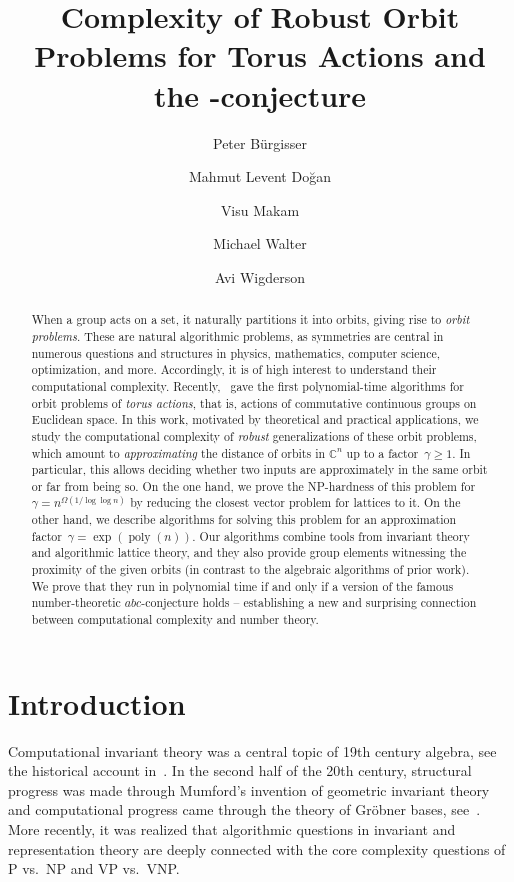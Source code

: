 \documentclass[a4paper,USenglish,cleveref,numberwithinsect]{lipics-v2021}
\title{Complexity of Robust Orbit Problems for Torus Actions and the \abc-conjecture}
\author{Peter B\"{u}rgisser}{Institute of Mathematics, Technische Universit\"{a}t Berlin, Germany.}{pbuerg@math.tu-berlin.de}{}{Supported by the ERC under the European Union's Horizon 2020 research and innovation programme (grant agreement no.~787840).}
\author{Mahmut Levent Do\u{g}an}{Institute of Mathematics, Technische Universit\"{a}t Berlin, Germany.}{dogan@math.tu-berlin.de}{}{Supported by the ERC under the European Union's Horizon 2020 research and innovation programme (grant agreement no.~787840).}
\author{Visu Makam}{Radix Trading, Amsterdam.}{visu@umich.edu}{}{Partially supported by NSF Grant CCF-1900460 and the University of Melbourne.}
\author{Michael Walter}{Faculty of Computer Science, Ruhr-Universit\"at Bochum, Germany.}{michael.walter@rub.de}{}{Supported by the European Union (ERC, SYMOPTIC, 101040907), by the Deutsche Forschungsgemeinschaft (DFG, German Research Foundation) under Germany's Excellence Strategy - EXC\ 2092\ CASA - 390781972, by the BMBF (QuBRA, 13N16135), and by the Dutch Research Council (NWO grant OCENW.KLEIN.267).}
\author{Avi Wigderson}{School of Mathematics, Institute for Advanced Study, Princeton.}{avi@ias.edu}{}{Supported by the NSF Grant CCF-1900460.}
\DeclareMathOperator{\poly}{poly}
\newcommand{\CC}{\mathbb{C}}
\numberwithin{equation}{section}
\begin{document}
\maketitle

\begin{abstract}
When a group acts on a set, it naturally partitions it into orbits, giving rise to \emph{orbit problems}.
These are natural algorithmic problems, as symmetries are central in numerous questions and structures in physics, mathematics, computer science, optimization, and more.
Accordingly, it is of high interest to understand their computational complexity.
Recently,~\cite{torus} gave the first polynomial-time algorithms for orbit problems of \emph{torus actions}, that is, actions of commutative continuous groups on Euclidean space.
In this work, motivated by theoretical and practical applications, we study the computational complexity of \textit{robust} generalizations of these orbit problems, which amount to \emph{approximating} the distance of orbits in $\CC^n$ up to a factor~$\gamma \ge 1$.
In particular, this allows deciding whether two inputs are approximately in the same orbit or far from being so.
On the one hand, we prove the NP-hardness of this problem for~$\gamma = n^{\Omega(1/\log\log n)}$ by reducing the closest vector problem for lattices to it.
On the other hand, we describe algorithms for solving this problem for an approximation factor~$\gamma = \exp(\poly(n))$.
Our algorithms combine tools from invariant theory and algorithmic lattice theory, and they also provide group elements witnessing the proximity of the given orbits (in contrast to the algebraic algorithms of prior work).
We prove that they run in polynomial time if and only if a version of the famous number-theoretic $abc$-conjecture holds -- establishing
a new and surprising connection between computational complexity and number theory.
\end{abstract}

\section{Introduction}
\label{sec:intro}

Computational invariant theory was a central topic of 19th century algebra,
see the historical account in~\cite{kung-rota:84}.
In the second half of the 20th century, structural progress was made through Mumford's invention
of geometric invariant theory ~\cite{MFK:94} and computational progress came through the theory of Gr\"{o}bner bases, see~\cite{Sturmfels}.
More recently, it was realized that algorithmic questions in invariant and representation theory
are deeply connected with the core complexity questions of P vs.~NP  and VP vs.~VNP.
\end{document}
